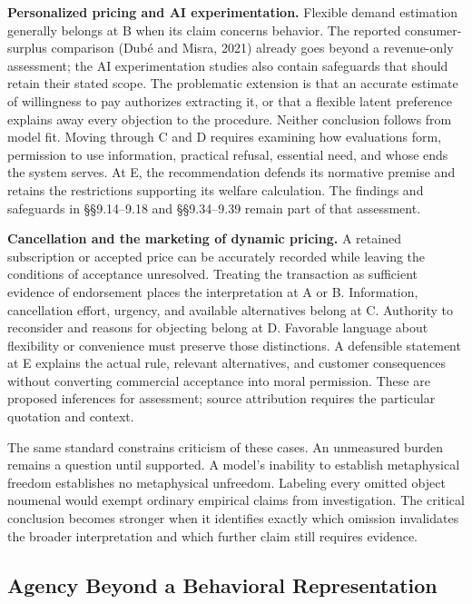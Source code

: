 \textbf{Personalized pricing and AI experimentation.} Flexible demand
estimation generally belongs at B when its claim concerns behavior. The
reported consumer-surplus comparison (Dubé and Misra, 2021) already goes
beyond a revenue-only assessment; the AI experimentation studies also
contain safeguards that should retain their stated scope. The
problematic extension is that an accurate estimate of willingness to pay
authorizes extracting it, or that a flexible latent preference explains
away every objection to the procedure. Neither conclusion follows from
model fit. Moving through C and D requires examining how evaluations
form, permission to use information, practical refusal, essential need,
and whose ends the system serves. At E, the recommendation defends its
normative premise and retains the restrictions supporting its welfare
calculation. The findings and safeguards in §§9.14--9.18 and
§§9.34--9.39 remain part of that assessment.

\textbf{Cancellation and the marketing of dynamic pricing.} A retained
subscription or accepted price can be accurately recorded while leaving
the conditions of acceptance unresolved. Treating the transaction as
sufficient evidence of endorsement places the interpretation at A or B.
Information, cancellation effort, urgency, and available alternatives
belong at C. Authority to reconsider and reasons for objecting belong at
D. Favorable language about flexibility or convenience must preserve
those distinctions. A defensible statement at E explains the actual
rule, relevant alternatives, and customer consequences without
converting commercial acceptance into moral permission. These are
proposed inferences for assessment; source attribution requires the
particular quotation and context.

The same standard constrains criticism of these cases. An unmeasured
burden remains a question until supported. A model's inability to
establish metaphysical freedom establishes no metaphysical unfreedom.
Labeling every omitted object noumenal would exempt ordinary empirical
claims from investigation. The critical conclusion becomes stronger when
it identifies exactly which omission invalidates the broader
interpretation and which further claim still requires evidence.

\hypertarget{M09-agency-beyond-a-behavioral-representation}{%
\subsection{Agency Beyond a Behavioral
Representation}\label{M09-agency-beyond-a-behavioral-representation}}

